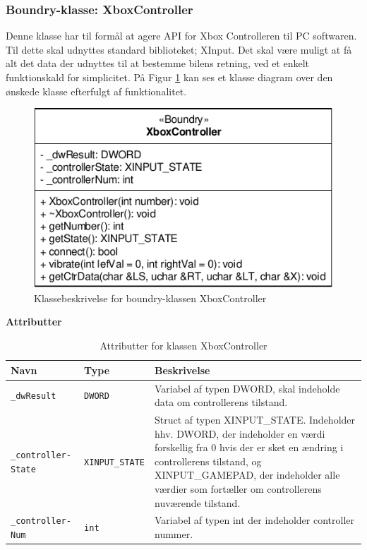 \subsubsection{Boundry-klasse: XboxController}

Denne klasse har til formål at agere API for Xbox Controlleren til PC softwaren. Til dette skal udnyttes standard biblioteket; XInput. Det skal være muligt at få alt det data der udnyttes til at bestemme bilens retning, ved et enkelt funktionskald for simplicitet. På Figur \ref{fig:cd_xboxcontroller} kan ses et klasse diagram over den ønskede klasse efterfulgt af funktionalitet.

\begin{figure}[h]
\centering
\includegraphics[]{../fig/diagrammer/pc/cd_xboxcontroller.pdf}
\caption{Klassebeskrivelse for boundry-klassen XboxController}
\label{fig:cd_xboxcontroller}
\end{figure}

\textbf{Attributter}

\begin{table}[h]
\begin{tabularx}{\textwidth}{| Z | Z | L{10cm} |} \hline
Navn & Type & Beskrivelse \\\hline
\texttt{\_dwResult}				& \texttt{DWORD}		&Variabel af typen DWORD, skal indeholde data om controllerens tilstand.\\\hline

\texttt{\_controller- State}	& \texttt{XINPUT\_STATE}&Struct af typen XINPUT\_STATE. Indeholder hhv. DWORD, der indeholder en værdi forskellig fra 0 hvis der er sket en ændring i controllerens tilstand, og XINPUT\_GAMEPAD, der indeholder alle værdier som fortæller om controllerens nuværende tilstand.\\\hline

\texttt{\_controller- Num}		& \texttt{int}			&Variabel af typen int der indeholder controller nummer.\\\hline
\end{tabularx}
\caption{Attributter for klassen XboxController}
\label{table:attr_xboxcontroller}
\end{table}

